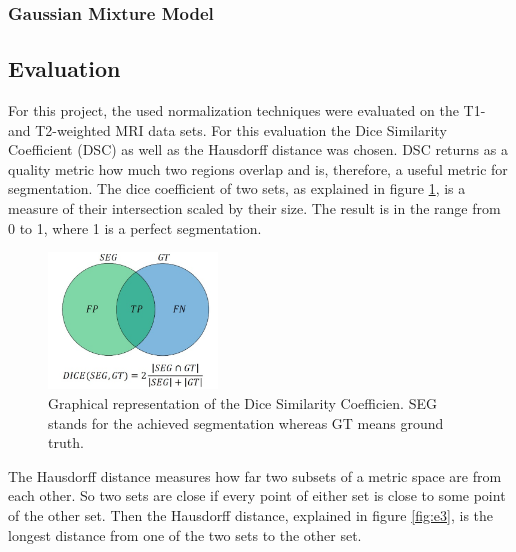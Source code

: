 \documentclass[journal]{IEEEtran}
\begin{document}
	\subsubsection{Gaussian Mixture Model}

\subsection{Evaluation}
	For this project, the used normalization techniques were evaluated on the T1- and T2-weighted MRI data sets. 
	For this evaluation the Dice Similarity Coefficient (DSC) as well as the Hausdorff distance was chosen.
	DSC returns as a quality metric how much two regions overlap and is, therefore, a useful metric for segmentation.
	The dice coefficient of two sets, as explained in figure \ref{fig:e2}, is a measure of their intersection scaled by their size. The result is in the range from 0 to 1, where 1 is a perfect segmentation. 
	
	\begin{figure}[h]
		\centering
		\includegraphics[width=0.4\textwidth]{diceGraphics}
		\caption{Graphical representation of the Dice Similarity Coefficien. SEG stands for the achieved segmentation whereas GT means ground truth.}
		\label{fig:e2}
	\end{figure}

	The Hausdorff distance measures how far two subsets of a metric space are from each other. So two sets are close if every point of either set is close 
	to some point of the other set. Then the Hausdorff distance, explained in figure \ref{fig:e3}, is the longest distance from one of the two sets to the other set.
\end{document}
